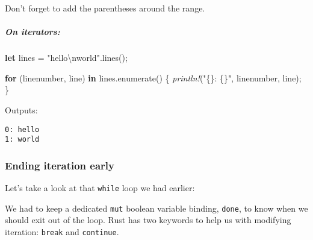 \documentclass[a4paper,]{book}
\newenvironment{Shaded}{\begin{snugshade}}{\end{snugshade}}
\newcommand{\KeywordTok}[1]{\textcolor[rgb]{0.13,0.29,0.53}{\textbf{{#1}}}}
\newcommand{\DecValTok}[1]{\textcolor[rgb]{0.00,0.00,0.81}{{#1}}}
\newcommand{\ConstantTok}[1]{\textcolor[rgb]{0.00,0.00,0.00}{{#1}}}
\newcommand{\SpecialCharTok}[1]{\textcolor[rgb]{0.00,0.00,0.00}{{#1}}}
\newcommand{\StringTok}[1]{\textcolor[rgb]{0.31,0.60,0.02}{{#1}}}
\newcommand{\PreprocessorTok}[1]{\textcolor[rgb]{0.56,0.35,0.01}{\textit{{#1}}}}
\newcommand{\NormalTok}[1]{{#1}}
\let\oldsubparagraph\subparagraph
\renewcommand{\subparagraph}[1]{\oldsubparagraph{#1}\mbox{}}
\begin{document}
Don't forget to add the parentheses around the range.

\subparagraph{On iterators:}\label{on-iterators}

\begin{Shaded}
\begin{Highlighting}[]
\KeywordTok{let} \NormalTok{lines = }\StringTok{"hello}\SpecialCharTok{\textbackslash{}n}\StringTok{world"}\NormalTok{.lines();}

\KeywordTok{for} \NormalTok{(linenumber, line) }\KeywordTok{in} \NormalTok{lines.enumerate() \{}
    \PreprocessorTok{println!}\NormalTok{(}\StringTok{"\{\}: \{\}"}\NormalTok{, linenumber, line);}
\NormalTok{\}}
\end{Highlighting}
\end{Shaded}

Outputs:

\begin{verbatim}
0: hello
1: world
\end{verbatim}

\subsubsection{Ending iteration early}\label{ending-iteration-early}

Let's take a look at that \texttt{while} loop we had earlier:

\begin{Shaded}
\end{Shaded}

We had to keep a dedicated \texttt{mut} boolean variable binding,
\texttt{done}, to know when we should exit out of the loop. Rust has two
keywords to help us with modifying iteration: \texttt{break} and
\texttt{continue}.
\end{document}
